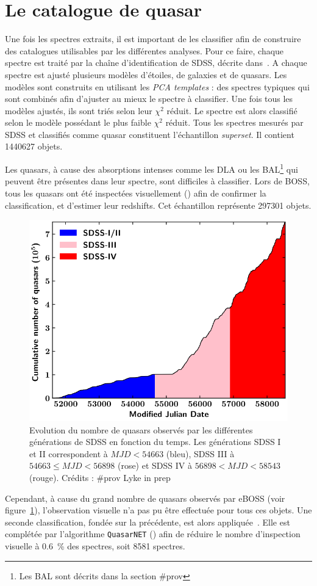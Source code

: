 \documentclass[11pt, twoside, a4paper, openright]{report}
\begin{document}
\section{Le catalogue de quasar}
Une fois les spectres extraits, il est important de les classifier afin de construire des catalogues utilisables par les différentes analyses. Pour ce faire, chaque spectre est traité par la chaîne d'identification de SDSS, décrite dans~\cite{Bolton2012}. A chaque spectre est ajusté plusieurs modèles d'étoiles, de galaxies et de quasars. Les modèles sont construits en utilisant les \emph{PCA templates} : des spectres typiques qui sont combinés afin d'ajuster au mieux le spectre à classifier. Une fois tous les modèles ajustés, ils sont triés selon leur $\chi^{2}$ réduit. Le spectre est alors classifié selon le modèle possédant le plus faible $\chi^{2}$ réduit.
Tous les spectres mesurés par SDSS et classifiés comme quasar constituent l'échantillon \emph{superset}. Il contient \num{1440627} objets.

Les quasars, à cause des absorptions intenses comme les DLA ou les BAL\footnote{Les BAL sont décrits dans la section \#prov} qui peuvent être présentes dans leur spectre, sont difficiles à classifier.
Lors de BOSS, tous les quasars ont été inspectées visuellement (\cite{Paris2016}) afin de confirmer la classification, et d'estimer leur redshifts. Cet échantillon représente \num{297301} objets.
\begin{figure}
  \centering
  \includegraphics[scale=0.4]{quasar_number}
  \caption{Evolution du nombre de quasars observés par les différentes générations de SDSS en fonction du temps. Les générations SDSS I et II correspondent à $MJD < 54663$ (bleu), SDSS III à $54663 \leq MJD < 56898$ (rose) et SDSS IV à $56898 < MJD < 58543$ (rouge). Crédits : \#prov Lyke in prep}
  \label{fig:quasar_number}
\end{figure}
Cependant, à cause du grand nombre de quasars observés par eBOSS (voir figure~\ref{fig:quasar_number}), l'observation visuelle n'a pas pu être effectuée pour tous ces objets. Une seconde classification, fondée sur la précédente, est alors appliquée~\cite{CITE:Lyke in prep}. Elle est complétée par l'algorithme \texttt{QuasarNET} (\cite{Busca2018}) afin de réduire le nombre d'inspection visuelle à \SI{0.6}{\percent} des spectres, soit \num{8581} spectres.
\end{document}
